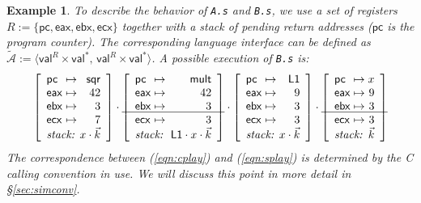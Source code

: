 \documentclass[11pt,oneside,draft]{book}
\newtheorem{example}[theorem]{Example}
\theoremstyle{definition}
\newcommand{\kw}[1]{\ensuremath{ \mathsf{#1} }}
\newcommand{\figsize}{}
\newcommand{\ul}[1]{%
  \underline{\smash{#1}}
}
\begin{document}
\begin{example}
To describe the behavior of \texttt{A.s} and \texttt{B.s},
we use a set of registers
$R := \{ \kw{pc}, \kw{eax}, \kw{ebx}, \kw{ecx} \}$
together with a stack of pending return addresses
($\kw{pc}$ is the program counter).
The corresponding language interface can be defined as
$\tilde{\mathcal{A}} :=
 \langle \kw{val}^R \times \kw{val}^*, \,
         \kw{val}^R \times \kw{val}^* \rangle$.
A possible execution of \texttt{B.s}
is: %
\begin{equation} \label{eqn:splay}
{
  \figsize
  \left[
    \begin{array}{l@{{} \mapsto {}}r}
      \kw{pc}  & \kw{sqr} \\
      \kw{eax} & 42 \\
      \kw{ebx} & 3 \\
      \kw{ecx} & 7 \\
      \multicolumn{2}{c}{\textit{stack: } \hfill x \cdot \vec{k}}
    \end{array}
  \right] \cdot
  \ul{
    \left[
      \begin{array}{l@{{} \mapsto {}}r}
        \kw{pc}  & \kw{mult} \\
        \kw{eax} & 42 \\
        \kw{ebx} & 3 \\
        \kw{ecx} & 3 \\
        \multicolumn{2}{c}{\textit{stack: } \: \kw{L1} \cdot x \cdot \vec{k}}
      \end{array}
    \right]} \cdot
  \left[
    \begin{array}{l@{{} \mapsto {}}r}
      \kw{pc}  & \kw{L1} \\
      \kw{eax} & 9 \\
      \kw{ebx} & 3 \\
      \kw{ecx} & 3 \\
      \multicolumn{2}{c}{\textit{stack: } \hfill x \cdot \vec{k}}
    \end{array}
  \right] \cdot
  \ul{
    \left[
      \begin{array}{l@{{} \mapsto {}}r}
        \kw{pc}  & x \\
        \kw{eax} & 9 \\
        \kw{ebx} & 3 \\
        \kw{ecx} & 3 \\
        \multicolumn{2}{c}{\textit{stack: } \hfill \vec{k}}
      \end{array}
    \right]}
}
\end{equation}
The correspondence between (\ref{eqn:cplay}) and (\ref{eqn:splay})
is determined by the C calling convention in use.
We will discuss this point in more detail in \S\ref{sec:simconv}.
\end{example}
\end{document}
